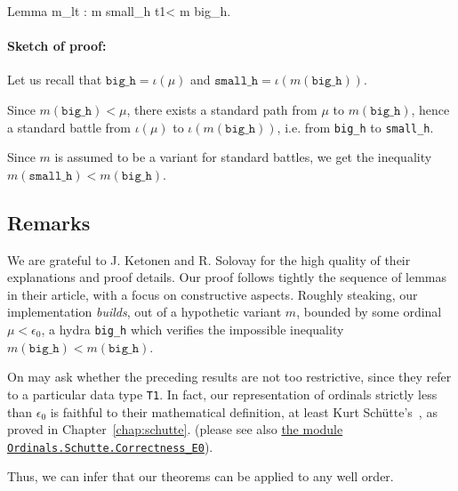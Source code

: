 \documentclass[a4paper]{book}
\begin{document}
\begin{Coqsrc}
Lemma m_lt : m small_h  t1< m big_h.
\end{Coqsrc}


\paragraph*{Sketch of proof:} Let us recall that $\texttt{big\_h} = \iota(\mu)$
 and $\texttt{small\_h} = \iota (m (\texttt{big\_h}))$.

Since $m(\texttt{big\_h})< \mu$, there exists a standard path from $\mu$ to
$m(\texttt{big\_h})$, hence a   standard battle from $\iota(\mu)$  to
$\iota(m(\texttt{big\_h}))$,  i.e. from \texttt{big\_h} to \texttt{small\_h}.

Since $m$ is assumed to be a variant for standard battles, we get the inequality  $m(\texttt{small\_h}) < m(\texttt{big\_h})$.



\subsection{Remarks}

We are grateful to 
 J. Ketonen and R. Solovay  for the high quality of their explanations and proof details.
Our proof follows tightly the sequence of lemmas in their article, with a focus on 
constructive aspects.
Roughly steaking, our implementation \emph{builds}, out of a hypothetic 
  variant $m$, bounded by some ordinal $\mu<\epsilon_0$, a hydra \texttt{big\_h} which verifies the impossible inequality  $m(\texttt{big\_h})< m(\texttt{big\_h})$.



On may ask whether the preceding results are not too restrictive, since they 
refer to a particular data type \texttt{T1}.
In fact, our representation of ordinals strictly less than 
 $\epsilon_0$ is faithful to their mathematical definition, at least 
Kurt Schütte's~\cite{schutte}, as proved in Chapter~\vref{chap:schutte}.
(please see also \href{../src/html/hydras.Schutte.Correctness_E0.html}{the module \texttt{Ordinals.Schutte.Correctness\_E0}}).

Thus, we can infer that our theorems can be applied to any well order.
\end{document}
